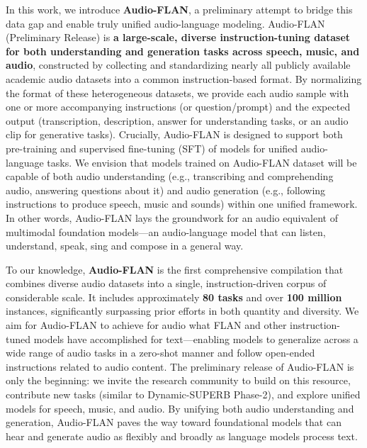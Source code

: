 In this work, we introduce \textbf{Audio-FLAN}, a preliminary attempt to bridge this data gap and enable truly unified audio-language modeling. Audio-FLAN (Preliminary Release) is \textbf{a large-scale, diverse instruction-tuning dataset for both understanding and generation tasks across speech, music, and audio}, constructed by collecting and standardizing nearly all publicly available academic audio datasets into a common instruction-based format. By normalizing the format of these heterogeneous datasets, we provide each audio sample with one or more accompanying instructions (or question/prompt) and the expected output (transcription, description, answer for understanding tasks, or an audio clip for generative tasks). Crucially, Audio-FLAN is designed to support both pre-training and supervised fine-tuning (SFT) of models for unified audio-language tasks. We envision that models trained on Audio-FLAN dataset will be capable of both audio understanding (e.g., transcribing and comprehending audio, answering questions about it) and audio generation (e.g., following instructions to produce speech, music and sounds) within one unified framework. In other words, Audio-FLAN lays the groundwork for an audio equivalent of multimodal foundation models—an audio-language model that can listen, understand, speak, sing and compose in a general way.

To our knowledge, \textbf{Audio-FLAN} is the first comprehensive compilation that combines diverse audio datasets into a single, instruction-driven corpus of considerable scale. It includes approximately \textbf{80 tasks} and over \textbf{100 million} instances, significantly surpassing prior efforts in both quantity and diversity. We aim for Audio-FLAN to achieve for audio what FLAN and other instruction-tuned models have accomplished for text—enabling models to generalize across a wide range of audio tasks in a zero-shot manner and follow open-ended instructions related to audio content. The preliminary release of Audio-FLAN is only the beginning: we invite the research community to build on this resource, contribute new tasks (similar to Dynamic-SUPERB Phase-2), and explore unified models for speech, music, and audio. By unifying both audio understanding and generation, Audio-FLAN paves the way toward foundational models that can hear and generate audio as flexibly and broadly as language models process text.

